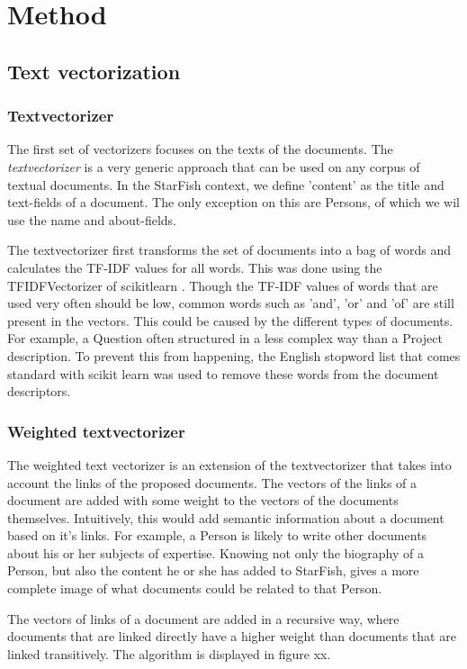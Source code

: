 \section{Method}

\subsection{Text vectorization}
\subsubsection{Textvectorizer}

The first set of vectorizers focuses on the texts of the documents. The \emph{textvectorizer} is a very generic approach that can be used on any corpus of textual documents. In the StarFish context, we define 'content' as the title and text-fields of a document. The only exception on this are Persons, of which we wil use the name and about-fields. 

The textvectorizer first transforms the set of documents into a bag of words and calculates the TF-IDF values for all words. This was done using the TFIDFVectorizer of scikitlearn \citep{scikit-learn}.  Though the TF-IDF values of words that are used very often should be low, common words such as 'and', 'or' and 'of' are still present in the vectors. This could be caused by the different types of documents. For example, a Question often structured in a less complex way than a Project description. To prevent this from happening, the English stopword list that comes standard with scikit learn was used to remove these words from the document descriptors.

\subsubsection{Weighted textvectorizer}
The weighted text vectorizer is an extension of the textvectorizer that takes into account the links of the proposed documents. The vectors of the links of a document are added with some weight to the vectors of the documents themselves. Intuitively, this would add semantic information about a document based on it's links. For example, a Person is likely to write other documents about his or her subjects of expertise. Knowing not only the biography of a Person, but also the content he or she has added to StarFish, gives a more complete image of what documents could be related to that Person.

The vectors of links of a document are added in a recursive way, where documents that are linked directly have a higher weight than documents that are linked transitively. The algorithm is displayed in figure xx.

